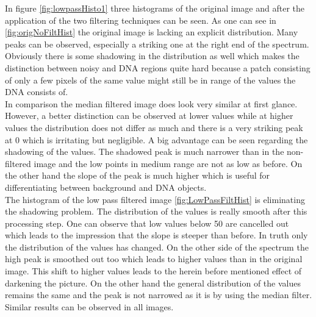 \documentclass{article}
\begin{document}
In figure \ref{fig:lowpassHisto1} three histograms of the original image and after the application of the two filtering techniques can be seen. As one can see in \ref{fig:origNoFiltHist} the original image is lacking an explicit distribution. Many peaks can be observed, especially a striking one at the right end of the spectrum. Obviously there is some shadowing in the distribution as well which makes the distinction between noisy and DNA regions quite hard because a patch consisting of only a few pixels of the same value might still be in range of the values the DNA consists of.\\
In comparison the median filtered image does look very similar at first glance. However, a better distinction can be observed at lower values while at higher values the distribution does not differ as much and there is a very striking peak at 0 which is irritating but negligible. A big advantage can be seen regarding the shadowing of the values. The shadowed peak is much narrower than in the non-filtered image and the low points in medium range are not as low as before. On the other hand the slope of the peak is much higher which is useful for differentiating between background and DNA objects. \\
The histogram of the low pass filtered image \ref{fig:LowPassFiltHist} is eliminating the shadowing problem. The distribution of the values is really smooth after this processing step. One can observe that low values below 50 are cancelled out which leads to the impression that the slope is steeper than before. In truth only the distribution of the values has changed. On the other side of the spectrum the high peak is smoothed out too which leads to higher values than in the original image. This shift to higher values leads to the herein before mentioned effect of darkening the picture. On the other hand the general distribution of the values remains the same and the peak is not narrowed as it is by using the median filter. Similar results can be observed in all images.
\end{document}
